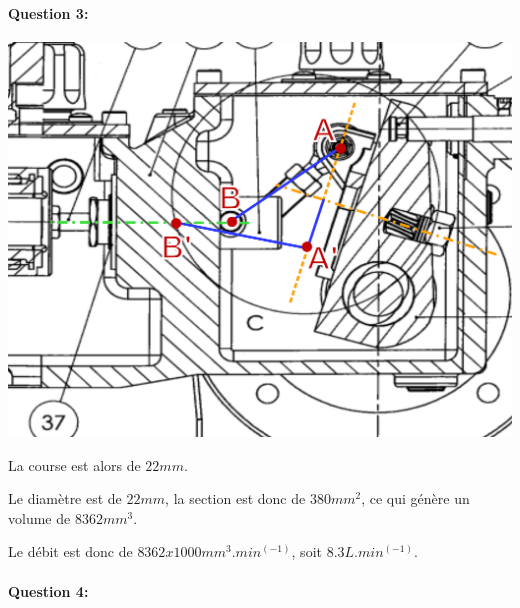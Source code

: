 \newpage

\paragraph{Question 3:}

\begin{center}
 \includegraphics[width=0.8\linewidth]{img/Milroyal_course}
\end{center}

La course est alors de $22mm$.

Le diamètre est de $22mm$, la section est donc de $380mm^2$, ce qui génère un volume de $8362mm^3$.

Le débit est donc de $8362x1000mm^3.min^(-1)$, soit $8.3L.min^(-1)$.

\newpage

\paragraph{Question 4:}

